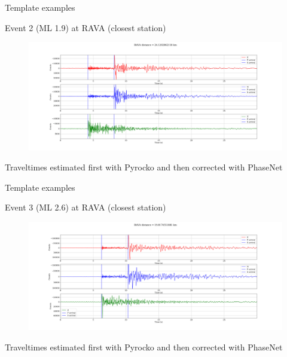 \documentclass[aspectratio=43,9pt]{beamer}
\begin{document}
\begin{frame}{Template examples}

\centering Event 2 (ML 1.9) at RAVA (closest station)
\begin{figure}
 \includegraphics[width=1\linewidth]{figs/event_2_RAVA.png}
\end{figure}

Traveltimes estimated first with Pyrocko and then corrected with PhaseNet

\end{frame}


\begin{frame}{Template examples}

\centering Event 3 (ML 2.6) at RAVA (closest station)
\begin{figure}
 \includegraphics[width=1\linewidth]{figs/event_3_RAVA.png}
\end{figure}

Traveltimes estimated first with Pyrocko and then corrected with PhaseNet

\end{frame}
\end{document}

